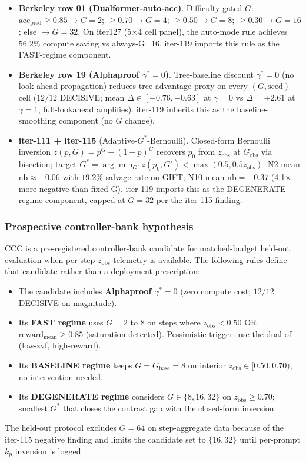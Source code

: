 \begin{itemize}
\item \textbf{Berkeley row 01 (Dualformer-auto-acc)}.
  Difficulty-gated $G$: $\mathrm{acc}_{\mathrm{pred}}\geq 0.85 \rightarrow G=2$;
  $\geq 0.70 \rightarrow G=4$; $\geq 0.50 \rightarrow G=8$; $\geq 0.30
  \rightarrow G=16$; else $\rightarrow G=32$. On iter127 (5$\times$4 cell
  panel), the auto-mode rule achieves $56.2\%$ compute saving vs
  always-G=16. iter-119 imports this rule as the FAST-regime component.
\item \textbf{Berkeley row 19 (Alphaproof $\gamma^*=0$)}.
  Tree-baseline discount $\gamma^*=0$ (no look-ahead propagation) reduces
  tree-advantage proxy on every $(G, \mathrm{seed})$ cell ($12/12$
  DECISIVE; mean $\Delta \in [-0.76, -0.63]$ at $\gamma=0$ vs
  $\Delta=+2.61$ at $\gamma=1$, full-lookahead amplifies). iter-119
  inherits this as the baseline-smoothing component (no $G$ change).
\item \textbf{iter-111 + iter-115} (Adaptive-$G^*$-Bernoulli).
  Closed-form Bernoulli inversion $z(p,G)=p^G+(1-p)^G$ recovers $p_0$ from
  $z_{\mathrm{obs}}$ at $G_{\mathrm{obs}}$ via bisection; target
  $G^*=\arg\min_{G'} z(p_0,G') < \max(0.5, 0.5 z_{\mathrm{obs}})$. N2
  mean $\mathrm{nb}\approx+0.06$ with $19.2\%$ salvage rate on GIFT;
  N10 mean $\mathrm{nb}=-0.37$ (4.1$\times$ more negative than
  fixed-G). iter-119 imports this as the DEGENERATE-regime component,
  capped at $G=32$ per the iter-115 finding.
\end{itemize}

\subsubsection*{Prospective controller-bank hypothesis}

CCC is a pre-registered controller-bank candidate for matched-budget
held-out evaluation when per-step $z_{\mathrm{obs}}$ telemetry is available.
The following rules define that candidate rather than a deployment prescription:
\begin{itemize}
\item The candidate includes \textbf{Alphaproof $\gamma^*=0$} (zero compute
  cost; $12/12$ DECISIVE on magnitude).
\item Its \textbf{FAST regime} uses $G=2$ to $8$ on steps where
  $z_{\mathrm{obs}}<0.50$ OR $\mathrm{reward}_{\mathrm{mean}}\geq 0.85$
  (saturation detected). Pessimistic trigger: use the dual of
  (low-zvf, high-reward).
\item Its \textbf{BASELINE regime} keeps $G=G_{\mathrm{base}}=8$ on interior
  $z_{\mathrm{obs}}\in[0.50, 0.70)$; no intervention needed.
\item Its \textbf{DEGENERATE regime} considers $G\in\{8,16,32\}$ on
  $z_{\mathrm{obs}}\geq 0.70$; smallest $G^*$ that closes the contrast
  gap with the closed-form inversion.
\end{itemize}
The held-out protocol excludes $G=64$ on step-aggregate data because of the
iter-115 negative finding and limits the candidate set to $\{16,32\}$ until
per-prompt $k_p$ inversion is logged.

